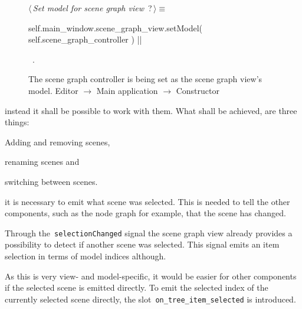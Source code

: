 \documentclass[%
    a4paper,    %
    justified,  %
    nobib,      %
    openany     %
]{tufte-book}
\makeatletter
\renewcommand{\label}[1]{\@tufte@label{##1}}%
\makeatother
\begin{document}
\begin{figure}
\begin{flushleft} \small
\begin{minipage}{\linewidth}\label{scrap42}\raggedright\small
{} $\langle\,${\itshape Set model for scene graph view}\nobreak\ {\footnotesize {?}}$\,\rangle\equiv$
\vspace{-1ex}
\begin{pythoncode}
self.main_window.scene_graph_view.setModel(
    self.scene_graph_controller
)
|\NWsep|
\end{pythoncode}
\vspace{1.5ex}
\footnotesize
\begin{list}{}{\setlength{\itemsep}{-\parsep}\setlength{\itemindent}{-\leftmargin}}
\item \NWtxtMacroRefIn\ .

\item{}
\end{list}
\end{minipage}\vspace{4ex}
\end{flushleft}
\caption{The scene graph controller is being set as the scene graph view's
  model.
  \newline{}\newline{}Editor $\rightarrow$ Main application
  $\rightarrow$ Constructor}
\label{editor:lst:main-application:constructor:set-model}
\end{figure}

 instead it shall be
possible to work with them. What shall be achieved, are three things:
\begin{enumerate*}
  \item Adding and removing scenes,
  \item renaming scenes and
  \item switching between scenes.
\end{enumerate*}

 it is necessary to emit what scene was
selected. This is needed to tell the other components, such as the node graph
for example, that the scene has changed.

Through the~\verb=selectionChanged= signal the scene graph view already provides
a possibility to detect if another scene was selected. This signal emits an item
selection in terms of model indices although.

As this is very view- and model-specific, it would be easier for other
components if the selected scene is emitted directly. To emit the selected index
of the currently selected scene directly, the slot~\verb=on_tree_item_selected=
is introduced.
\end{document}
